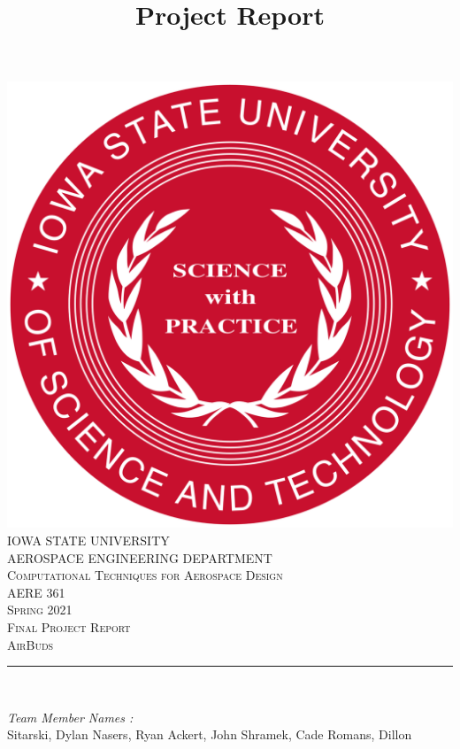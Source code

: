 \documentclass[12pt]{article}
\begin{document}
\title{Project Report}

\begin{titlepage}
	\centering
    \vspace*{0.5 cm}
    \includegraphics[scale = 0.11]{isu_seal.png}\\[1.0 cm]	%
    \textsc{\LARGE IOWA STATE UNIVERSITY}\\[2.0 cm]
    \textsc{\large AEROSPACE ENGINEERING DEPARTMENT}\\[0.2 cm]
    \textsc{\large Computational Techniques for Aerospace Design}\\[0.2 cm]
	\textsc{\Large AERE 361}\\[0.5 cm]				%
	\textsc{\Large Spring 2021}\\[0.5 cm]				%
	\textsc{\Large Final Project Report}\\[0.2 cm]
	\textsc{\Large AirBuds}\\[0.2 cm]
	\rule{\linewidth}{0.2 mm} \\[0.4 cm]
	
	
	\begin{minipage}{0.8\textwidth}
		
			\begin{flushleft} 
			\emph{Team Member Names :} \\
			Sitarski, Dylan\linebreak
			Nasers, Ryan\linebreak
			Ackert, John\linebreak
			Shramek, Cade\linebreak
			Romans, Dillon\linebreak
			

\end{flushleft}
\end{minipage}
\end{titlepage}
\end{document}
